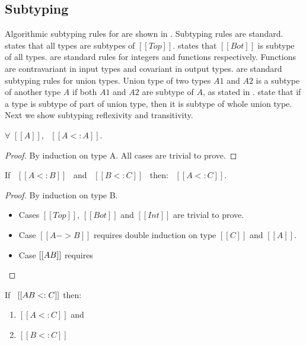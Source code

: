 \subsection{Subtyping}
\label{sec:union:sub}
Algorithmic subtyping rules for \dut are shown in . Subtyping rules are standard.
 states that all types are subtypes of $[[Top]]$.  states that $[[Bot]]$ is
subtype of all types.  are standard rules for integers and functions respectively.
Functions are contravariant in input types and covariant in output types.  are
standard subtyping rules for union types. Union type of two types $A1$ and $A2$ is a subtype of another
type $A$ if both $A1$ and $A2$ are subtype of $A$, as stated in .  state
that if a type is subtype of part of union type, then it is subtype of whole union type. Next we show
subtyping reflexivity and transitivity.

\begin{lemma}
\label{lemma:union:refl}
$\forall$ $[[A]]$, \ $[[A <: A]]$.
\end{lemma}

\begin{proof}
  By induction on type A. All cases are trivial to prove.
\end{proof}

\begin{lemma}
\label{lemma:union:trans}
If \ $[[A <: B]]$ \ and \ $[[B <: C]]$ \ then: \ $[[A <: C]]$.
\end{lemma}

\begin{proof}
  By induction on type B.
  \begin{itemize}
    \item Cases $[[Top]]$, $[[Bot]]$ and $[[Int]]$ are trivial to prove.
    \item Case $[[A -> B]]$ requires double induction on type $[[C]]$
          and $[[A]]$.
    \item Case $[[A \/ B]]$ requires 
  \end{itemize}
\end{proof}

\begin{lemma}
\label{lemma:union:sub-or}
  If \ $[[A \/ B <: C]]$ then:
  \begin{enumerate}
    \item $[[A <: C]]$ and
    \item $[[B <: C]]$
  \end{enumerate}
\end{lemma}

